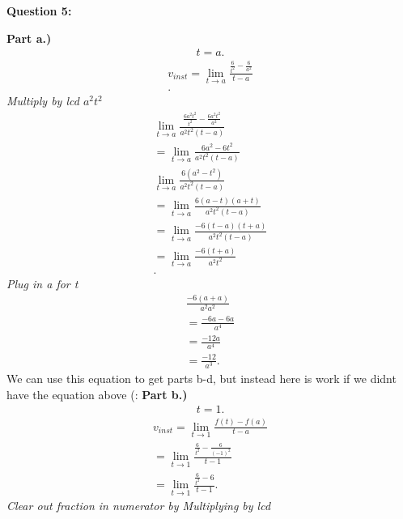 \documentclass{report}
\begin{document}
    \bigbreak \noindent \bigbreak \noindent \bigbreak \noindent 
    \begin{Large}
        \textbf{Question 5:}
    \end{Large}
    \bigbreak \noindent 
    \bigbreak \noindent 
    \textbf{Part a.)}
    \begin{align*}
        t = a
    .\end{align*}
    \begin{align*}
        v_{inst} = \lim\limits_{t \to a}{ \frac{ \frac{6}{t^2} - \frac{6}{a^2}}{t-a}} \\
    .\end{align*}
    \bigbreak \noindent 
    \textit{Multiply by lcd $a^2t^2$}
    \begin{align*}
        \lim\limits_{t \to a}{ \frac{ \frac{6a^2t^2}{t^2} - \frac{6a^2t^2}{a^2}}{a^2t^2(t-a)}} \\ 
        = \lim\limits_{t \to a}{ \frac{6a^2 - 6t^2}{a^2t^2(t-a)}} \\ 
        \lim\limits_{t \to a}{ \frac{6(a^2-t^2)}{a^2t^2(t - a)}} \\ 
        = \lim\limits_{t \to a}{ \frac{6(a-t)(a+t)}{a^2t^2(t-a )}} \\ 
        = \lim\limits_{t \to a}{ \frac{-6(t-a)(t+a)}{a^2t^2(t-a)}} \\ 
        = \lim\limits_{t \to a}{ \frac{-6(t+a)}{a^2t^2}} \\ 
    .\end{align*}
    \bigbreak \noindent 
    \textit{Plug in a for t}
    \begin{align*}
        \frac{-6(a+a)}{a^2a^2} \\ 
        = \frac{-6a-6a}{a^4} \\ 
        = \frac{-12a}{a^4} \\ 
        = \frac{-12}{a^3}
    .\end{align*}
    \bigbreak \noindent 
    We can use this equation to get parts b-d, but instead here is work if we didnt have the equation above (:
    \bigbreak \noindent 
    \textbf{Part b.)}
    \begin{align*}
        t=1  
    .\end{align*}
    \begin{align*}
        v_{inst} = \lim\limits_{t \to 1}{ \frac{f(t) - f(a)}{t - a}} \\
        = \lim\limits_{t \to 1}{ \frac{ \frac{6}{t^2} - \frac{6}{(-1)^2}}{t-1}} \\ 
        = \lim\limits_{t \to 1}{ \frac{ \frac{6}{t^2} - 6}{t - 1}}
    .\end{align*}
    \bigbreak \noindent 
    \textit{Clear out fraction in numerator by Multiplying by lcd}
\end{document}

